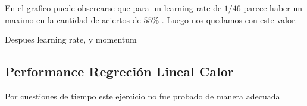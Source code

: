 En el grafico puede obsercarse que para un learning rate de $1/	46$ parece haber un maximo en la cantidad de aciertos de $55\%$ . Luego nos quedamos con este valor.

Despues learning rate, y momentum

\subsection{Performance Regreción Lineal Calor} 

Por cuestiones de tiempo este ejercicio no fue probado de manera adecuada